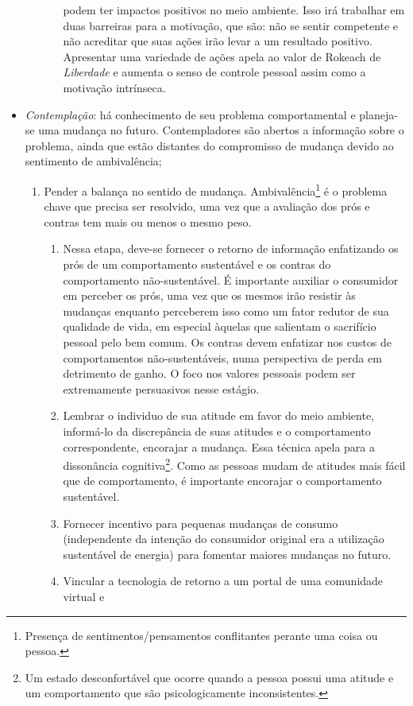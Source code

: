 \begin{itemize}
\begin{enumerate}
\begin{enumerate}
podem ter impactos positivos no meio ambiente. Isso irá trabalhar em duas
barreiras para a motivação, que são: não se sentir competente e não acreditar
que suas ações irão levar a um resultado positivo. Apresentar uma variedade de
ações apela ao valor de Rokeach de \emph{Liberdade} e aumenta o senso de
controle pessoal assim como a motivação intrínseca.
\end{enumerate}
\end{enumerate}
\item \emph{Contemplação}: há conhecimento de seu problema comportamental e
planeja-se uma mudança no futuro. Contempladores são abertos a informação sobre
o problema, ainda que estão distantes do compromisso de mudança devido ao
sentimento de ambivalência;
\begin{enumerate}
\item Pender a balança no sentido de mudança. Ambivalência\footnote{Presença de
sentimentos/pensamentos conflitantes perante uma coisa ou pessoa.} é o problema chave
que precisa ser resolvido, uma vez que a avaliação dos prós e contras tem mais
ou menos o mesmo peso.
\begin{enumerate}
\item Nessa etapa, deve-se fornecer o retorno de informação enfatizando os prós de um
comportamento sustentável e os contras do comportamento não-sustentável. É
importante auxiliar o consumidor em perceber os prós, uma vez que os mesmos irão
resistir às mudanças enquanto perceberem isso como um fator redutor de sua
qualidade de vida, em especial àquelas que salientam o sacrifício pessoal pelo
bem comum. Os contras devem enfatizar nos custos de comportamentos
não-sustentáveis, numa perspectiva de perda em detrimento de ganho. O foco nos
valores pessoais podem ser extremamente persuasivos nesse estágio.
\item Lembrar o individuo de sua atitude em favor do meio ambiente, informá-lo
da discrepância de suas atitudes e o comportamento correspondente, encorajar a
mudança. Essa técnica apela para a dissonância cognitiva\footnote{Um estado
desconfortável que ocorre quando a pessoa possui uma atitude e um comportamento
que são psicologicamente inconsistentes.}. Como as pessoas mudam de atitudes mais
fácil que de comportamento, é importante encorajar o comportamento sustentável.
\item Fornecer incentivo para pequenas mudanças de consumo (independente da
intenção do consumidor original era a utilização sustentável de energia) para
fomentar maiores mudanças no futuro.
\item Vincular a tecnologia de retorno a um portal de uma comunidade virtual e

\end{enumerate}
\end{enumerate}
\end{itemize}

